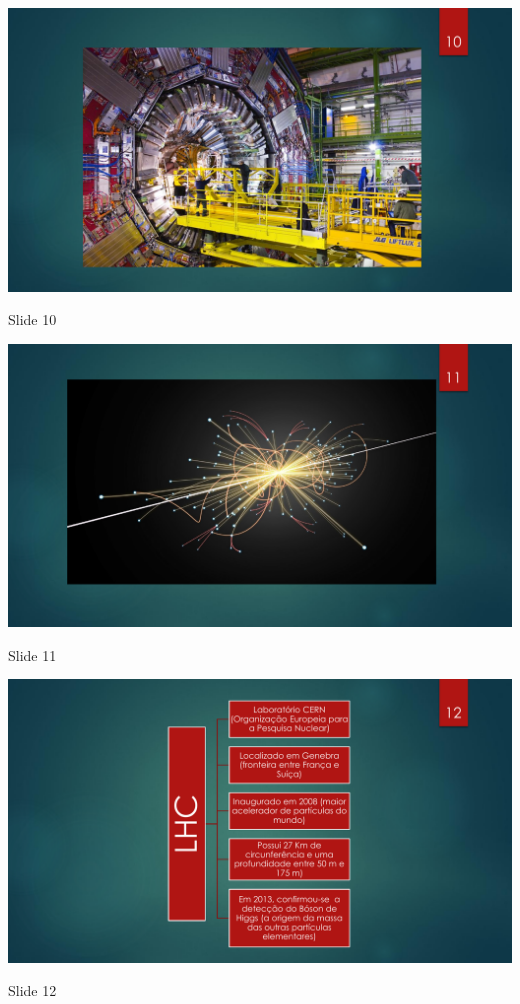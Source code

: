 \begin{figura}[ht]
	\centering
	\includegraphics[width=0.9 \textwidth]{ApeD/slide_10}
	\caption{Slide 10}
	\label{fig:app:slide_10}
\end{figura}

\begin{figura}[ht]
	\centering
	\includegraphics[width=0.9 \textwidth]{ApeD/slide_11}
	\caption{Slide 11}
	\label{fig:app:slide_11}
\end{figura}

\begin{figura}[ht]
	\centering
	\includegraphics[width=0.9 \textwidth]{ApeD/slide_12}
	\caption{Slide 12}
	\label{fig:app:slide_12}
\end{figura}
